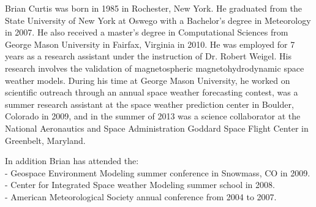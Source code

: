 \documentclass[11 pt]{report}
\begin{document}
\appendix
\appendixeqnumbering








\cvpage

\noindent Brian Curtis was born in 1985 in Rochester, New York. He
graduated from the State University of New York at Oswego with a Bachelor's
degree in Meteorology in 2007. He also received a master's degree in
Computational Sciences from George Mason University in Fairfax, Virginia in
2010. He was employed for 7 years as a research assistant under the instruction
of Dr. Robert Weigel. His research involves the validation of
magnetospheric magnetohydrodynamic space weather models. During his time at
George Mason University, he worked on scientific outreach through an annual space
weather forecasting contest, was a summer research assistant at the space
weather prediction center in Boulder, Colorado in 2009, and in the summer of 2013
was a science collaborator at the National Aeronautics and Space Administration Goddard Space
Flight Center in Greenbelt, Maryland.

In addition Brian has attended the:\\
- Geospace Environment Modeling summer conference in Snowmass, CO in 2009.\\
- Center for Integrated Space weather Modeling summer school in 2008.\\
- American Meteorological Society annual conference from 2004 to 2007.
\end{document}
